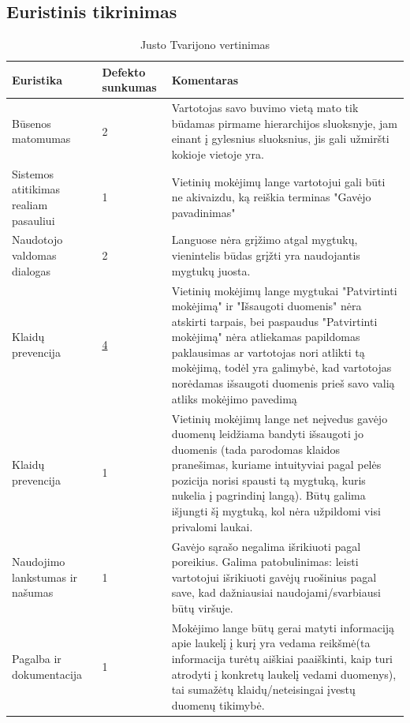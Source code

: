 \documentclass[oneside]{VUMIFPSkursinis}
\begin{document}
\subsection{Euristinis tikrinimas}
\begin{center}
\begin{longtable}[!htb]{|p{3.5cm}|p{1.9cm}|p{9.6cm}|}
	\caption{Justo Tvarijono vertinimas}
	\endfirsthead
	\endhead
  \hline
	Euristika & Defekto sunkumas & Komentaras \\ \hline
	Būsenos matomumas & 2 & Vartotojas savo buvimo vietą mato tik būdamas pirmame hierarchijos sluoksnyje, jam einant į gylesnius sluoksnius, jis gali užmiršti kokioje vietoje yra. \\ \hline
	Sistemos atitikimas realiam pasauliui & 1 & Vietinių mokėjimų lange vartotojui gali būti ne akivaizdu, ką reiškia terminas "Gavėjo pavadinimas" \\ \hline
	Naudotojo valdomas dialogas & 2 & Languose nėra grįžimo atgal mygtukų, vienintelis būdas grįžti yra naudojantis mygtukų juosta. \\ \hline
	Klaidų prevencija \label{lentele:klaiduPrevencijaJ} & \hyperref[fig:klaiduPrevencijaMygtukai]{4} & Vietinių mokėjimų lange mygtukai "Patvirtinti mokėjimą" ir "Išsaugoti duomenis" nėra atskirti tarpais, bei paspaudus "Patvirtinti mokėjimą" nėra atliekamas papildomas paklausimas ar vartotojas nori atlikti tą mokėjimą, todėl yra galimybė, kad vartotojas norėdamas išsaugoti duomenis prieš savo valią atliks mokėjimo pavedimą\\ \hline
	Klaidų prevencija & 1 & Vietinių mokėjimų lange net neįvedus gavėjo duomenų leidžiama bandyti išsaugoti jo duomenis (tada parodomas klaidos pranešimas, kuriame intuityviai pagal pelės pozicija norisi spausti tą mygtuką, kuris nukelia į pagrindinį langą). Būtų galima išjungti šį mygtuką, kol nėra užpildomi visi privalomi laukai. \\ \hline
	Naudojimo lankstumas ir našumas & 1 & Gavėjo sąrašo negalima išrikiuoti pagal poreikius. Galima patobulinimas: leisti vartotojui išrikiuoti gavėjų ruošinius pagal save, kad dažniausiai naudojami/svarbiausi būtų viršuje. \\ \hline
	Pagalba ir dokumentacija & 1 & Mokėjimo lange būtų gerai matyti informaciją apie laukelį į kurį yra vedama reikšmė(ta informacija turėtų aiškiai paaiškinti, kaip turi atrodyti į konkretų laukelį vedami duomenys), tai sumažėtų klaidų/neteisingai įvestų duomenų tikimybė.  \\ \hline
\end{longtable}
\end{center}
\end{document}
